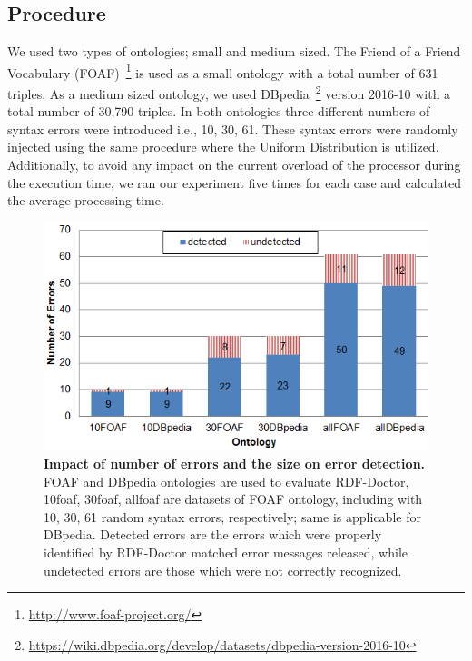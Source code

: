 \subsection{Procedure}

We used two types of ontologies; small and medium sized. 
The Friend of a Friend Vocabulary (FOAF)~\footnote{\url{http://www.foaf-project.org/}} is used as a small ontology with a total number of 631 triples. 
As a medium sized ontology, we used DBpedia~\footnote{\url{https://wiki.dbpedia.org/develop/datasets/dbpedia-version-2016-10}} version 2016-10 with a total number of 30,790 triples. 
In both ontologies three different numbers of syntax errors were introduced i.e., 10, 30, 61. These syntax errors were randomly injected using the same procedure where the Uniform Distribution is utilized.
Additionally, to avoid any impact on the current overload of the processor during the execution time, we ran our experiment five times for each case and calculated the average processing time.

 \begin{figure}[ht]
\begin{center}
		\includegraphics[scale=0.9,angle=0]{images/Experiment03-01.png}
		\vspace*{-4mm}
		\caption{\textbf{Impact of number of errors and the size on error detection.} 
		FOAF and DBpedia ontologies are used to evaluate RDF-Doctor, 10foaf, 30foaf, allfoaf are datasets of FOAF ontology, including with 10, 30, 61 random syntax errors, respectively; same is applicable for DBpedia. Detected errors are the errors which were properly identified by RDF-Doctor matched error messages  released, while undetected errors are those which were not correctly recognized.}
		\label{Fig:Experiment03-01}
\end{center}
\end{figure}
